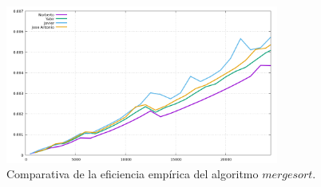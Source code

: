 \documentclass[11pt,a4paper]{article}
\begin{document}
\begin{figure}[H]
	\centering
	\includegraphics[width=0.8\textwidth]{../plots/mergesort}
	\caption{Comparativa de la eficiencia empírica del algoritmo $mergesort$.}
\end{figure}
\end{document}
